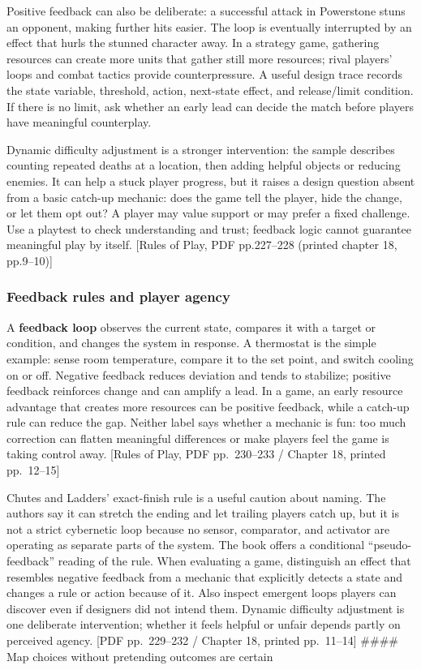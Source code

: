 Positive feedback can also be deliberate: a successful attack in Powerstone stuns an opponent, making further hits easier. The loop is eventually interrupted by an effect that hurls the stunned character away. In a strategy game, gathering resources can create more units that gather still more resources; rival players' loops and combat tactics provide counterpressure. A useful design trace records the state variable, threshold, action, next-state effect, and release/limit condition. If there is no limit, ask whether an early lead can decide the match before players have meaningful counterplay.

Dynamic difficulty adjustment is a stronger intervention: the sample describes counting repeated deaths at a location, then adding helpful objects or reducing enemies. It can help a stuck player progress, but it raises a design question absent from a basic catch-up mechanic: does the game tell the player, hide the change, or let them opt out? A player may value support or may prefer a fixed challenge. Use a playtest to check understanding and trust; feedback logic cannot guarantee meaningful play by itself. {[}Rules of Play, PDF pp.227--228 (printed chapter 18, pp.9--10){]}

\subsubsection{Feedback rules and player agency}\label{05-engine-i-ch009-feedback-rules-and-player-agency}

A \textbf{feedback loop} observes the current state, compares it with a target or condition, and changes the system in response. A thermostat is the simple example: sense room temperature, compare it to the set point, and switch cooling on or off. Negative feedback reduces deviation and tends to stabilize; positive feedback reinforces change and can amplify a lead. In a game, an early resource advantage that creates more resources can be positive feedback, while a catch-up rule can reduce the gap. Neither label says whether a mechanic is fun: too much correction can flatten meaningful differences or make players feel the game is taking control away. {[}Rules of Play, PDF pp.~230--233 / Chapter 18, printed pp.~12--15{]}

Chutes and Ladders' exact-finish rule is a useful caution about naming. The authors say it can stretch the ending and let trailing players catch up, but it is not a strict cybernetic loop because no sensor, comparator, and activator are operating as separate parts of the system. The book offers a conditional ``pseudo-feedback'' reading of the rule. When evaluating a game, distinguish an effect that resembles negative feedback from a mechanic that explicitly detects a state and changes a rule or action because of it. Also inspect emergent loops players can discover even if designers did not intend them. Dynamic difficulty adjustment is one deliberate intervention; whether it feels helpful or unfair depends partly on perceived agency. {[}PDF pp.~229--232 / Chapter 18, printed pp.~11--14{]} \#\#\#\# Map choices without pretending outcomes are certain

